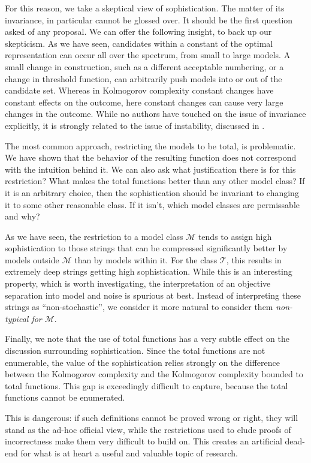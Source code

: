 \documentclass{style/llncs}
\newcommand{\M}{\mathscr M}
\newcommand{\T}{\mathscr T}
\begin{document}
For this reason, we take a skeptical view of sophistication. The matter of its invariance, in particular cannot be glossed over. It should be the first question asked of any proposal. We can offer the following insight, to back up our skepticism. As we have seen, candidates within a constant of the optimal representation can occur all over the spectrum, from small to large models. A small change in construction, such as a different acceptable numbering, or a change in threshold function, can arbitrarily push models into or out of the candidate set. Whereas in Kolmogorov complexity constant changes have constant effects on the outcome, here constant changes can cause very large changes in the outcome. While no authors have touched on the issue of invariance explicitly, it is strongly related to the issue of instability, discussed in \cite{antunes2013sophistication,vereshchagin2013algorithmic}.

The most common approach, restricting the models to be total, is problematic. We have shown that the behavior of the resulting function does not correspond with the intuition behind it. We can also ask what justification there is for this restriction? What makes the total functions better than any other model class? If it is an arbitrary choice, then the sophistication should be invariant to changing it to some other reasonable class. If it isn't, which model classes are permissable and why? 

As we have seen, the restriction to a model class $\M$ tends to assign high sophistication to those strings that can be compressed significantly better by models outside $\M$ than by models within it. For the class $\T$, this results in extremely deep strings getting high sophistication. While this is an interesting property, which is worth investigating, the interpretation of an objective separation into model and noise is spurious at best. Instead of interpreting these strings as ``non-stochastic'', we consider it more natural to consider them \emph{non-typical for $\M$}.  

Finally, we note that the use of total functions has a very subtle effect on the discussion surrounding sophistication. Since the total functions are not enumerable, the value of the sophistication relies strongly on the difference between the Kolmogorov complexity and the Kolmogorov complexity bounded to total functions. This gap is exceedingly difficult to capture, because the total functions cannot be enumerated. 

This is dangerous: if such definitions cannot be proved wrong or right, they will stand as the ad-hoc official view, while the restrictions used to elude proofs of incorrectness make them very difficult to build on. This creates an artificial dead-end for what is at heart a useful and valuable topic of research.
\end{document}
